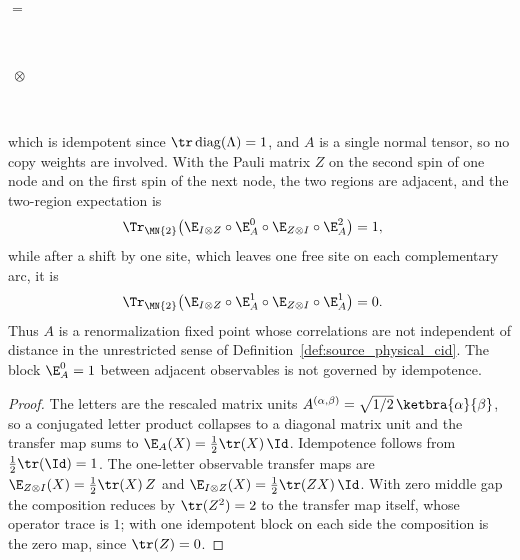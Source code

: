 \begin{lemma}
\begin{tenkzequation}
\begin{tenkz}[rows={ket,bra}, cols=1, west=open, east=open]
             \\
        \end{tenkz}
        $ = $
        \begin{tenkz}[rows={wire,wire}, cols=1, west=open,
                east={cup=$\Lambda$}, bonds=none]
            \tn[skin=none]{} \\ \tn[skin=none]{}
        \end{tenkz}
        $\;\otimes\;$
        \begin{tenkz}[rows={wire,wire}, cols=1, west=cup, east=open,
                bonds=none]
            \tn[skin=none]{} \\ \tn[skin=none]{}
        \end{tenkz}
    \end{tenkzequation}
    which is idempotent since $\tr\operatorname{diag}(\Lambda)=1$, and $A$ is
    a single normal tensor, so no copy weights are involved. With the Pauli
    matrix $Z$ on the second spin of one node and on the first spin of the
    next node, the two regions are adjacent, and the two-region expectation is
    \begin{align}
        \Tr_{\MN{2}}\!\left(
        \E_{I\otimes Z}\circ\E_A^{0}\circ\E_{Z\otimes I}\circ\E_A^{2}\right)
         & =1,
        \notag
    \end{align}
    while after a shift by one site, which leaves one free site on each
    complementary arc, it is
    \begin{align}
        \Tr_{\MN{2}}\!\left(
        \E_{I\otimes Z}\circ\E_A^{1}\circ\E_{Z\otimes I}\circ\E_A^{1}\right)
         & =0.
        \notag
    \end{align}
    Thus $A$ is a renormalization fixed point whose correlations are not
    independent of distance in the unrestricted sense of
    Definition~\ref{def:source_physical_cid}. The block $\E_A^{0}=1$ between
    adjacent observables is not governed by idempotence.
\end{lemma}
\begin{proof}\leanok
    The letters are the rescaled matrix units
    $A^{(\alpha,\beta)}=\sqrt{1/2}\,\ketbra{\alpha}{\beta}$, so a conjugated
    letter product collapses to a diagonal matrix unit and the transfer map
    sums to $\E_A(X)=\frac12\tr(X)\,\Id$. Idempotence follows from
    $\frac12\tr(\Id)=1$. The one-letter observable transfer maps are
    $\E_{Z\otimes I}(X)=\frac12\tr(X)\,Z$ and
    $\E_{I\otimes Z}(X)=\frac12\tr(ZX)\,\Id$. With zero middle gap the
    composition reduces by $\tr(Z^{2})=2$ to the transfer map itself, whose
    operator trace is $1$; with one idempotent block on each side the
    composition is the zero map, since $\tr(Z)=0$.
\end{proof}

